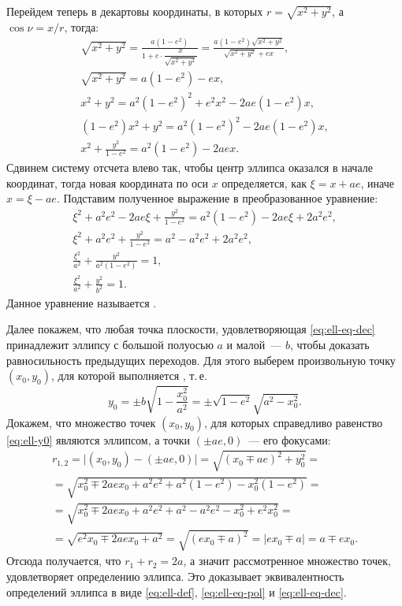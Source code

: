 Перейдем теперь в декартовы координаты, в которых $r = \sqrt{x^2 + y^2}$, а $\cos \nu = x / r$, тогда:
\begin{gather*}
	\sqrt{x^2 + y^2} = \frac{a(1 - e^2)}{1 + e \cdot \dfrac{x}{\sqrt{x^2 + y^2}}} = \frac{a (1 - e^2) \sqrt{x^2 + y^2}}{\sqrt{x^2 + y^2} + e x},\\
	\sqrt{x^2 + y^2} = a(1 - e^2) - e x,\\
	x^2 + y^2 = a^2 (1 - e^2)^2 + e^2 x^2 - 2ae(1 - e^2) x,\\
	(1 - e^2) x^2 + y^2 = a^2 (1 - e^2)^2 - 2ae (1 - e^2) x,\\
	x^2 + \frac{y^2}{1 - e^2} = a^2 (1 - e^2) - 2aex.
\end{gather*}
Сдвинем систему отсчета влево так, чтобы центр эллипса оказался в начале координат, тогда новая координата по оси $x$ определяется, как $\xi = x + ae$, иначе $x = \xi - ae$. Подставим полученное выражение в преобразованное уравнение:
\begin{gather*}
	\xi^2 + a^2 e^2 - 2ae\xi + \frac{y^2}{1 - e^2} = a^2 (1 - e^2) - 2 ae\xi + 2 a^2 e^2,\\
	\xi^2 + a^2 e^2  + \frac{y^2}{1 - e^2} = a^2 - a^2 e^2 + 2 a^2 e^2,\\
	\frac{\xi^2}{a^2} + \frac{y^2}{a^2 (1 - e^2)} = 1,\\
	\frac{\xi^2}{a^2} + \frac{y^2}{b^2} = 1. \tag{\theequation} \label{eq:ell-eq-dec}
\end{gather*}
Данное уравнение называется .

Далее покажем, что любая точка плоскости, удовлетворяющая \eqref{eq:ell-eq-dec} принадлежит эллипсу с большой полуосью $a$ и малой~--- $b$, чтобы доказать равносильность предыдущих переходов. Для этого выберем произвольную точку $(x_0, y_0)$, для которой выполняется \label{eq:ell-eq-dec}, т.\,е.
\begin{equation}
	y_0 = \pm b \sqrt{1 - \frac{x_0^2}{a^2}} = \pm \sqrt{1 - e^2} \sqrt{a^2 - x_0^2}. \label{eq:ell-y0}
\end{equation}
Докажем, что множество точек $(x_0, y_0)$, для которых справедливо равенство \eqref{eq:ell-y0} являются эллипсом, а точки $(\pm a e, 0)$~--- его фокусами:
\begin{multline*}
	r_{1,2}
	= \big| (x_0, y_0) - (\pm ae, 0) \big|
	= \sqrt{(x_0 \mp ae)^2 + y_0^2} =\\
	= \sqrt{x_0^2 \mp 2 a e x_0 + a^2 e^2 + a^2(1 - e^2) - x_0^2(1 - e^2)} =\\
	= \sqrt{x_0^2 \mp 2 a e x_0 + a^2 e^2 + a^2 - a^2 e^2 - x_0^2 + e^2 x_0^2} = \\
	= \sqrt{e^2 x_0 \mp 2 a e x_0 + a^2 } = \sqrt{(e x_0 \mp a)^2} = |e x_0 \mp a| = a \mp ex_0.
\end{multline*}
Отсюда получается, что $r_1 + r_2 = 2a$, а значит рассмотренное множество точек, удовлетворяет определению эллипса. Это доказывает эквивалентность определений эллипса в виде \eqref{eq:ell-def}, \eqref{eq:ell-eq-pol} и \eqref{eq:ell-eq-dec}.


